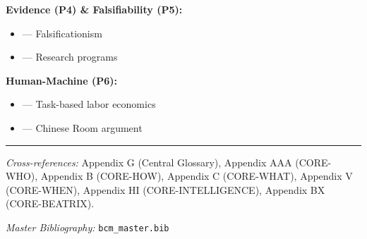 \textbf{Evidence (P4) \& Falsifiability (P5):}
\begin{itemize}[nosep]
    \item \citet{popper1959logic} --- Falsificationism
    \item \citet{lakatos1978methodology} --- Research programs
\end{itemize}

\textbf{Human-Machine (P6):}
\begin{itemize}[nosep]
    \item \citet{autor2003skill} --- Task-based labor economics
    \item \citet{PAP-searle1980minds} --- Chinese Room argument
\end{itemize}

\nocite{bcm_master}



\vspace{1em}
\hrule
\vspace{0.5em}

\noindent\textit{Cross-references:}
Appendix G (Central Glossary),
Appendix AAA (CORE-WHO),
Appendix B (CORE-HOW),
Appendix C (CORE-WHAT),
Appendix V (CORE-WHEN),
Appendix HI (CORE-INTELLIGENCE),
Appendix BX (CORE-BEATRIX).

\noindent\textit{Master Bibliography:} \texttt{bcm\_master.bib}


